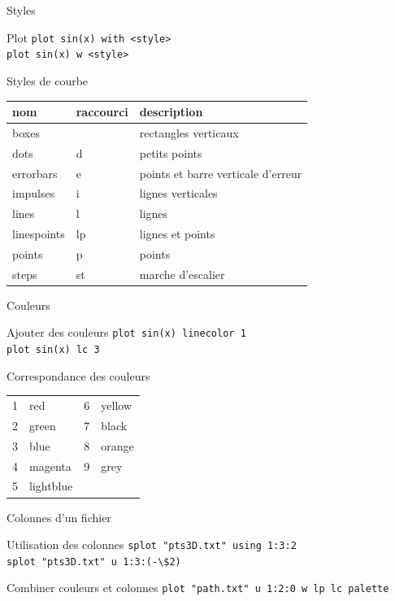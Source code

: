 \documentclass{beamer}
\begin{document}
\begin{frame}{Styles}

\begin{block}{Plot}
\verb?plot sin(x) with <style>?\\
\verb?plot sin(x) w <style>?
\end{block}

\begin{block}{Styles de courbe}
\begin{tabular}{l l l}
\textbf{nom} & \textbf{raccourci} & \textbf{description} \\
\hline
boxes   &   & rectangles verticaux \\
dots    & d & petits points \\
errorbars & e & points et barre verticale d'erreur \\
impulses  & i & lignes verticales \\
lines     & l &       lignes\\
linespoints & lp &   lignes et points\\
points      & p &     points\\
steps      & st &      marche d'escalier
\end{tabular}
\end{block}
\end{frame}

\begin{frame}{Couleurs}

\begin{block}{Ajouter des couleurs}
\verb?plot sin(x) linecolor 1?\\
\verb?plot sin(x) lc 3?
\end{block}

\begin{block}{Correspondance des couleurs}
\begin{tabular}{c l | c l}
1 & red & 6 & yellow \\
2 & green & 7 & black \\
3 & 	blue & 8 & orange \\ 
4 & 	magenta & 9 & grey \\
5 &	lightblue
\end{tabular}

\end{block}

\end{frame}


\begin{frame}{Colonnes d'un fichier}

\begin{block}{Utilisation des colonnes}
\verb?splot "pts3D.txt" using 1:3:2?\\
\verb?splot "pts3D.txt" u 1:3:(-\$2)?
\end{block}

\begin{block}{Combiner couleurs et colonnes}
\verb?plot "path.txt" u 1:2:0 w lp lc palette?
\end{block}

\end{frame}
\end{document}
